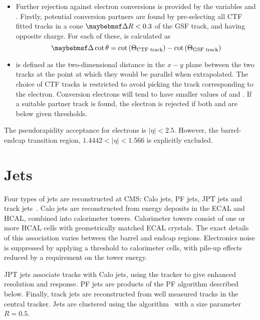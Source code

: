 \begin{itemize}
\item Further rejection against electron conversions is provided by the
  variables \Distnm and \DeltaCotThetanm. Firstly, potential conversion partners
  are found by pre-selecting all \ac{CTF} fitted tracks in a cone $\DeltaR <
  0.3$ of the \ac{GSF} track, and having opposite charge. For each of these,
  \DeltaCotThetanm is calculated as
\begin{equation*}
  \DeltaCotThetanm = \cot\left(\Theta_{\textrm{CTF track}}\right) - \cot\left(\Theta_{\textrm{GSF track}}\right)
\end{equation*}
\item \Distnm is defined as the two-dimensional distance in the $x-y$ plane between the
two tracks at the point at which they would be parallel when extrapolated. The
choice of \ac{CTF} tracks is restricted to avoid picking the track corresponding
to the electron. Conversion electrons will tend to have smaller values of
\DeltaCotTheta and \Dist. If a suitable partner track is found, the electron is
rejected if both \Dist and \DeltaCotTheta are below given thresholds.
\end{itemize}

The pseudorapidity acceptance for electrons is $|\eta| < 2.5$. However, the
barrel-endcap transition region, $1.4442 < |\eta| < 1.566$ is explicitly excluded.



\section{Jets}
\label{sec:reco_jets}
Four types of jets are reconstructed at \ac{CMS}: \acf{Calo} jets, \ac{PF} jets,
\ac{JPT} jets and track jets~\cite{jet_perf_pas}. \ac{Calo} jets are
reconstructed from energy deposits in the \ac{ECAL} and \ac{HCAL}, combined into
calorimeter towers. Calorimeter towers consist of one or more \ac{HCAL} cells
with geometrically matched \ac{ECAL} crystals. The exact details of this
association varies between the barrel and endcap regions. Electronics noise is
suppressed by applying a threshold to calorimeter cells, with pile-up effects
reduced by a requirement on the tower energy.

\ac{JPT} jets associate tracks with \ac{Calo} jets, using the tracker to give
enhanced \Pt resolution and response. \ac{PF} jets are products of the \acl{PF}
algorithm described below. Finally, track jets are reconstructed from well
measured tracks in the central tracker. Jets are clustered using the \antiKT
algorithm~\cite{antiKT} with a size parameter $R=0.5$.

